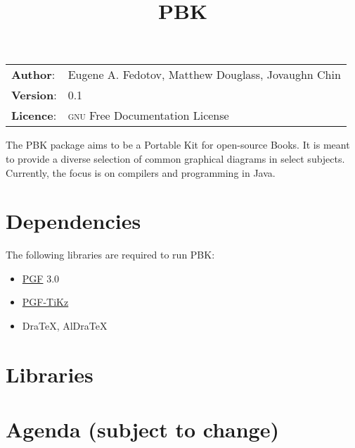 \documentclass[10pt,a4paper,english]{article}
\title{PBK}
\author{}
\date{}
\newlength{\docinfowidth}
\newlength{\locallinewidth}
\begin{document}
\maketitle
\begin{center}
\begin{tabularx}{\docinfowidth}{lX}
\textbf{Author}: &
	Eugene A. Fedotov, Matthew Douglass, Jovaughn Chin \\
\textbf{Version}: &
	0.1 \\
\textbf{Licence}: &
	\textsc{gnu} Free
	Documentation License \\
\end{tabularx}
\end{center}

\setlength{\locallinewidth}{\linewidth}


The PBK package aims to be a Portable Kit for open-source Books. It is meant to provide a diverse selection of common graphical diagrams in select subjects. Currently, the focus is on compilers and programming in Java.



\section*{Dependencies}
\label{dependencies}

The following libraries are required to run PBK:
\begin{itemize}
\item {} 
\href{https://www.ctan.org/pkg/pgf}{PGF} 3.0
\item {} 
\href{http://www.ctan.org/topic/pgf-tikz}{PGF-TiKz}
\item {}
DraTeX, AlDraTeX
\end{itemize}



\section*{Libraries}
\label{libraries}




\section*{Agenda \small{(subject to change)}}
\end{document}
